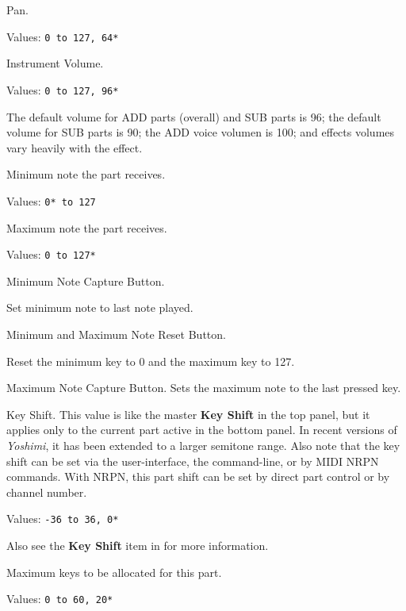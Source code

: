   Pan.

   Values: \texttt{0 to 127, 64*}


   Instrument Volume.

   Values: \texttt{0 to 127, 96*}
 
   The default volume for ADD parts (overall) and SUB parts is 96; the
   default volume for SUB parts is 90; the ADD voice volumen is 100; and
   effects volumes vary heavily with the effect.

   Minimum note the part receives.

   Values: \texttt{0* to 127}

   Maximum note the part receives.

   Values: \texttt{0 to 127*}

   Minimum Note Capture Button.

   Set minimum note to last note played.

   Minimum and Maximum Note Reset Button.

   Reset the minimum key to 0 and the maximum key to 127.

   Maximum Note Capture Button.
   Sets the maximum note to the last pressed key.

   Key Shift.
   This value is like the master \textbf{Key Shift} in the top panel, but
   it applies only to the current part active in the bottom panel.
   In recent versions of \textsl{Yoshimi}, it has been extended to a larger
   semitone range.
   Also note that the key shift can be set via the user-interface, the
   command-line, or by MIDI NRPN commands.
   With NRPN, this part shift 
   can be set by direct part control or by channel number.

   Values: \texttt{-36 to 36, 0*}

   Also see the \textbf{Key Shift} item in 
    for more information.

   Maximum keys to be allocated for this part.

   Values: \texttt{0 to 60, 20*}

